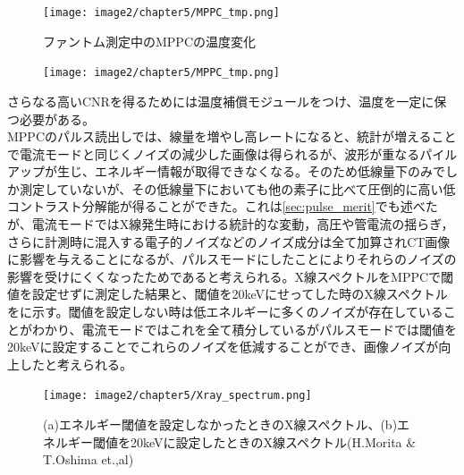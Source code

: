 \begin{figure}[H]
 \begin{minipage}{0.5\hsize}
  \begin{center}
   \texttt{[image: image2/chapter5/MPPC\_tmp.png]} 
  \end{center}
  \vspace{-1cm}
  \caption*{ファントム測定中のMPPCの温度変化}
 \end{minipage}
 \begin{minipage}{0.5\hsize}
  \begin{center}
 \texttt{[image: image2/chapter5/MPPC\_tmp.png]} 
  \end{center}
  \vspace{-1cm}
  \caption*{}
 \end{minipage}
 \begin{center}
  \caption{}
  \label{fig:MPPC_tmp}
  \end{center}
\end{figure}

さらなる高いCNRを得るためには温度補償モジュールをつけ、温度を一定に保つ必要がある。\\
MPPCのパルス読出しでは、線量を増やし高レートになると、統計が増えることで電流モードと同じくノイズの減少した画像は得られるが、波形が重なるパイルアップが生じ、エネルギー情報が取得できなくなる。そのため低線量下のみでしか測定していないが、その低線量下においても他の素子に比べて圧倒的に高い低コントラスト分解能が得ることができた。これは\ref{sec:pulse_merit}でも述べたが、電流モードではX線発生時における統計的な変動，高圧や管電流の揺らぎ，さらに計測時に混入する電子的ノイズなどのノイズ成分は全て加算されCT画像に影響を与えることになるが、パルスモードにしたことによりそれらのノイズの影響を受けにくくなったためであると考えられる。X線スペクトルをMPPCで閾値を設定せずに測定した結果と、閾値を20keVにせってした時のX線スペクトルをに示す。閾値を設定しない時は低エネルギーに多くのノイズが存在していることがわかり、電流モードではこれを全て積分しているがパルスモードでは閾値を20keVに設定することでこれらのノイズを低減することができ、画像ノイズが向上したと考えられる。




\begin{figure}[H]
 \begin{center}
 \texttt{[image: image2/chapter5/Xray\_spectrum.png]} 
 \end{center}
 \caption{(a)エネルギー閾値を設定しなかったときのX線スペクトル、(b)エネルギー閾値を20keVに設定したときのX線スペクトル(H.Morita \& T.Oshima et.,al)}
 \label{fig:Xray_spectrum}
\end{figure}



